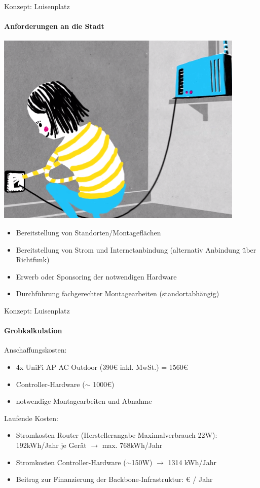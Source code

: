 \documentclass[]{beamer}
\begin{document}
\begin{frame}{Konzept: Luisenplatz}
\framesubtitle{Anforderungen an die Stadt}
\vfill
\begin{center}
\includegraphics[height=0.4\textheight]{../global/images/freifunk_setup}$\;$
\vfill \pause
\end{center}
\begin{itemize}
\item Bereitstellung von Standorten/Montageflächen \pause
\item Bereitstellung von Strom und Internetanbindung (alternativ Anbindung über Richtfunk) \pause
\item Erwerb oder Sponsoring der notwendigen Hardware \pause
\item Durchführung fachgerechter Montagearbeiten (standortabhängig)
\end{itemize}
\vfill
\end{frame}

\begin{frame}{Konzept: Luisenplatz}
\framesubtitle{Grobkalkulation} \pause
Anschaffungskosten: \pause
\begin{itemize}
	\item 4x UniFi AP AC Outdoor (390\euro{} inkl. MwSt.) = 1560\euro{} \pause
	\item Controller-Hardware ($\sim$ 1000\euro{}) \pause
	\item notwendige Montagearbeiten und Abnahme \pause
\end{itemize}
\vfill \pause
Laufende Kosten: \pause
\begin{itemize}
	\item Stromkosten Router (Herstellerangabe Maximalverbrauch 22W):\newline
	192kWh/Jahr je Gerät $\rightarrow$ max. 768kWh/Jahr \pause
	\item Stromkosten Controller-Hardware \newline
	($\sim$150W) $\rightarrow$ 1314 kWh/Jahr \pause
	\item Beitrag zur Finanzierung der Backbone-Infrastruktur:  \euro{} / Jahr
\end{itemize}
\end{frame}
\end{document}
